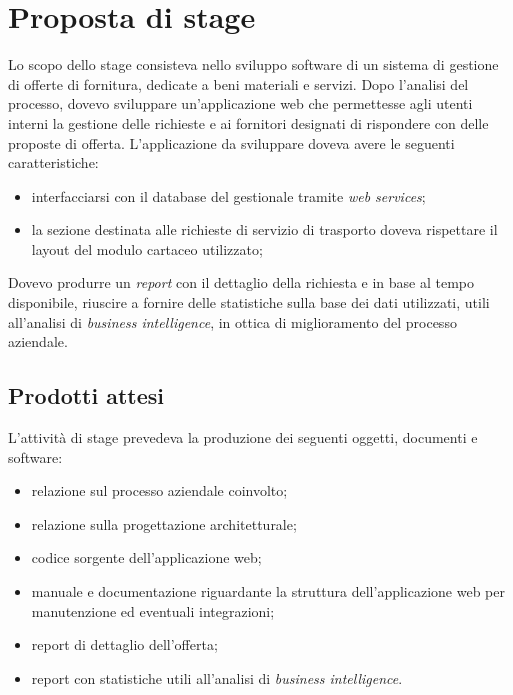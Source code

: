\section{Proposta di stage}

Lo scopo dello stage consisteva nello sviluppo software di un sistema di gestione di offerte di fornitura, dedicate a beni materiali e servizi. Dopo l'analisi del processo, dovevo sviluppare un'applicazione web che permettesse agli utenti interni la gestione delle richieste e ai fornitori designati di rispondere con delle proposte di offerta.
L'applicazione da sviluppare doveva avere le seguenti caratteristiche:
\begin{itemize}
	\item interfacciarsi con il database del gestionale tramite \textit{web services};
	\item la sezione destinata alle richieste di servizio di trasporto doveva rispettare il layout del modulo cartaceo utilizzato;
\end{itemize}
Dovevo produrre un \textit{report} con il dettaglio della richiesta e in base al tempo disponibile, riuscire a fornire delle statistiche sulla base dei dati utilizzati, utili all'analisi di \textit{business intelligence}, in ottica di miglioramento del processo aziendale.


\subsection{Prodotti attesi}
L'attività di stage prevedeva la produzione dei seguenti oggetti, documenti e software:
\begin{itemize}
	\item relazione sul processo aziendale coinvolto;
	\item relazione sulla progettazione architetturale;
	\item codice sorgente dell'applicazione web;
	\item manuale e documentazione riguardante la struttura dell'applicazione web per
	manutenzione ed eventuali integrazioni;
	\item report di dettaglio dell'offerta;
	\item report con statistiche utili all'analisi di \textit{business intelligence}.
\end{itemize}


